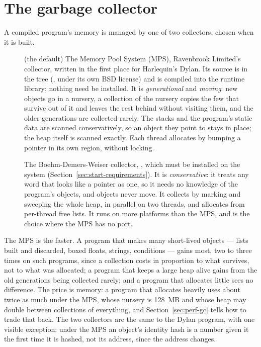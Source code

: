 \section{The garbage collector}\label{sec:dylanc-gc}

A compiled program's memory is managed by one of two collectors, chosen
when it is built.

\begin{description}
\item[] (the default) The Memory Pool System (MPS),
  Ravenbrook Limited's collector, written in the first place for
  Harlequin's Dylan. Its source is in the tree (,
  under its own BSD license) and is compiled into the runtime library;
  nothing need be installed. It is \emph{generational} and
  \emph{moving}: new objects go in a nursery, a collection of the nursery
  copies the few that survive out of it and leaves the rest behind
  without visiting them, and the older generations are collected rarely.
  The stacks and the program's static data are scanned conservatively,
  so an object they point to stays in place; the heap itself is scanned
  exactly. Each thread allocates by bumping a pointer in its own region,
  without locking.
\item[] The Boehm-Demers-Weiser collector,
  , which must be installed on the system
  (Section~\ref{sec:start-requirements}). It is \emph{conservative}: it
  treats any word that looks like a pointer as one, so it needs no
  knowledge of the program's objects, and objects never move. It
  collects by marking and sweeping the whole heap, in parallel on two
  threads, and allocates from per-thread free lists. It runs on more
  platforms than the MPS, and is the choice where the MPS has no port.
\end{description}

The MPS is the faster. A program that makes many short-lived objects
--- lists built and discarded, boxed floats, strings, conditions ---
gains most, two to three times on such programs, since a collection
costs in proportion to what survives, not to what was allocated; a
program that keeps a large heap alive gains from the old generations
being collected rarely; and a program that allocates little sees no
difference. The price is memory: a program that allocates heavily uses
about twice as much under the MPS, whose nursery is 128~MB and whose
heap may double between collections of everything, and
Section~\ref{sec:perf-gc} tells how to trade that back. The two
collectors are the same to the Dylan program, with one visible
exception: under the MPS an object's identity hash is a number given it
the first time it is hashed, not its address, since the address changes.

